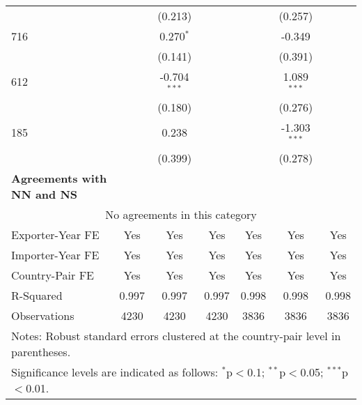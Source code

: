 \begin{table}[htbp]
\begin{adjustbox}{max width=\textwidth}
\begin{tabular}{lcccccc}
     &  & (0.213) &  &  & (0.257) &  \\
    716 &  & 0.270$^{\ast}$ &  &  & -0.349 &  \\
     &  & (0.141) &  &  & (0.391) &  \\
    612 &  & -0.704$^{\ast\ast\ast}$ &  &  & 1.089$^{\ast\ast\ast}$ &  \\
     &  & (0.180) &  &  & (0.276) &  \\
    185 &  & 0.238 &  &  & -1.303$^{\ast\ast\ast}$ &  \\
     &  & (0.399) &  &  & (0.278) &  \\
    \hline
    \textbf{Agreements with NN and NS} &  &  &  &  &  &  \\
    \hline
    \multicolumn{7}{c}{No agreements in this category} \\
    \hline
    Exporter-Year FE & Yes & Yes & Yes & Yes & Yes & Yes \\
    Importer-Year FE & Yes & Yes & Yes & Yes & Yes & Yes \\
    Country-Pair FE & Yes & Yes & Yes & Yes & Yes & Yes \\
    R-Squared & 0.997 & 0.997 & 0.997 & 0.998 & 0.998 & 0.998 \\
    Observations & 4230 & 4230 & 4230 & 3836 & 3836 & 3836 \\
    \hline
    \multicolumn{7}{l}{\footnotesize{Notes: Robust standard errors clustered at the country-pair level in parentheses.}} \\
    \multicolumn{7}{l}{\footnotesize{Significance levels are indicated as follows: $^{\ast}$p$<$0.1; $^{\ast\ast}$p$<$0.05; $^{\ast\ast\ast}$p$<$0.01.}} \\
    \end{tabular}
    \end{adjustbox}
\end{table}

